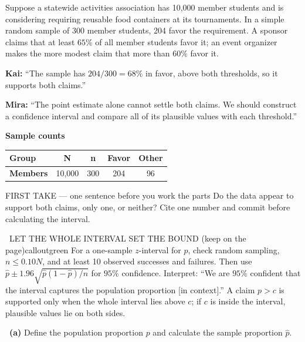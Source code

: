 \documentclass[11pt]{article}
\begin{document}
Suppose a statewide activities association has 10,000 member students and is considering requiring reusable food containers at its tournaments. In a simple random sample of 300 member students, 204 favor the requirement. A sponsor claims that at least $65\%$ of all member students favor it; an event organizer makes the more modest claim that more than $60\%$ favor it.\par\smallskip \textbf{Kai:} ``The sample has $204/300=68\%$ in favor, above both thresholds, so it supports both claims.''\par \textbf{Mira:} ``The point estimate alone cannot settle both claims. We should construct a confidence interval and compare all of its plausible values with each threshold.''\par
\begin{center}
\textbf{Sample counts}\par\smallskip
\begin{tabular}{|l|c|c|c|c|}
\hline
\textbf{Group} & \textbf{N} & \textbf{n} & \textbf{Favor} & \textbf{Other} \\ \hline
\textbf{Members} & 10,000 & 300 & 204 & 96 \\ \hline
\end{tabular}
\end{center}
\begin{firsttakebox}{FIRST TAKE --- one sentence before you work the parts}
Do the data appear to support both claims, only one, or neither? Cite one number and commit before calculating the interval.\par
{}
\end{firsttakebox}

\begin{callout}{\IconBook\ LET THE WHOLE INTERVAL SET THE BOUND (keep on the page)}{calloutgreen}
For a one-sample $z$-interval for $p$, check random sampling, $n\le0.10N$, and at least
10 observed successes and failures. Then use $\hat p\pm1.96\sqrt{\hat p(1-\hat p)/n}$
for $95\%$ confidence. Interpret: ``We are $95\%$ confident that the interval captures
the population proportion [in context].'' A claim $p>c$ is supported only when the whole
interval lies above $c$; if $c$ is inside the interval, plausible values lie on both sides.
\end{callout}

~\textbf{(a)} Define the population proportion $p$ and calculate the sample proportion $\hat p$.\par
{}
\end{document}
